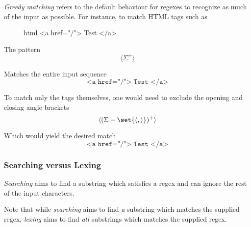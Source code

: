 \begin{definition}
    \textit{Greedy matching} refers to the default behaviour for regexes to recognize as much of the input as possible. For instance, to match HTML tags such as
    \begin{figure}[H]
        \centering
        \begin{cminted}{html}
        <a href="/"> Test </a>
        \end{cminted}
    \end{figure}
    
    The pattern
    \begin{equation*}
        \langle \Sigma^+ \rangle
    \end{equation*}
    
    Matches the entire input sequence
    \begin{equation*}
        \boxed{\texttt{<a href="/"> Test </a>}}
    \end{equation*}
    
    To match only the tags themselves, one would need to exclude the opening and closing angle brackets
    \begin{equation*}
        \langle (\Sigma - \set{\langle, \rangle})^+ \rangle
    \end{equation*}
    
    Which would yield the desired match
    \begin{equation*}
        \boxed{\texttt{<a href="/">}}
        \texttt{ Test }
        \boxed{\texttt{</a>}}
    \end{equation*}
\end{definition}

\subsubsection{Searching versus Lexing}

\begin{definition}[Searching]
    \textit{Searching} aims to find a substring which satisfies a regex and can ignore the rest of the input characters.
\end{definition}

\begin{remark}
    Note that while \textit{searching} aims to find \textit{a} substring which matches the supplied regex, \textit{lexing} aims to find \textit{all} substrings which matches the supplied regex.
\end{remark}

